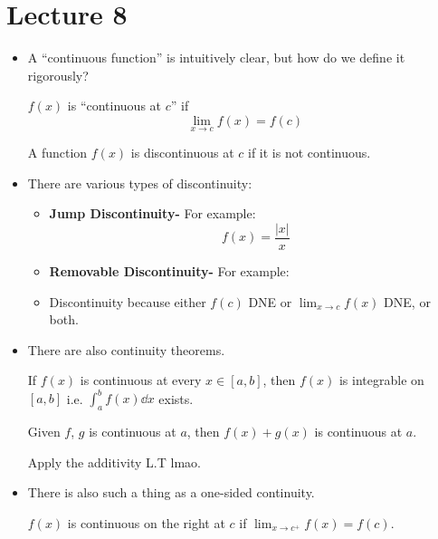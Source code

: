 \section{Lecture 8}
\begin{itemize}
    \item A ``continuous function'' is intuitively clear, but how do we define it rigorously?
    \begin{definition}
        $f(x)$ is ``continuous at $c$'' if
        \begin{equation}
            \lim_{x\to c}f(x)=f(c)
            \label{eq:}
        \end{equation}
    \end{definition}
    \begin{definition}
        A function $f(x)$ is discontinuous at $c$ if it is not continuous.
    \end{definition}
    \item There are various types of discontinuity:
    \begin{itemize}
        \item \textbf{Jump Discontinuity-} For example:
        \begin{equation}
            f(x)=\frac{|x|}{x}
            \label{eq:}
        \end{equation}
        \item \textbf{Removable Discontinuity-} For example:
        \item Discontinuity because either $f(c)$ DNE or $\displaystyle \lim_{x\to c} f(x)$ DNE, or both.
    \end{itemize}
    \item There are also continuity theorems.
    \begin{theorem}
        If $f(x)$ is continuous at every $x\in[a,b]$, then $f(x)$ is integrable on $[a,b]$ i.e. $\int_a^b f(x) \dd{x}$ exists.
    \end{theorem}
    \begin{theorem}
        Given $f$, $g$ is continuous at $a$, then $f(x)+g(x)$ is continuous at $a$.
    \end{theorem}
    \begin{prooof}
        Apply the additivity L.T lmao.
    \end{prooof}
    \item There is also such a thing as a one-sided continuity.
    \begin{definition}
        $f(x)$ is continuous on the right at $c$ if $\displaystyle\lim_{x\to c^+}f(x)=f(c)$.

\end{definition}
\end{itemize}
